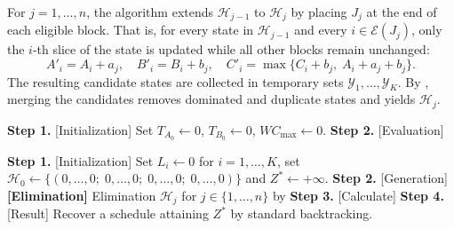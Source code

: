 ﻿\documentclass[12pt]{article}
\begin{document}
\begin{sloppypar}
For $j = 1,\dots,n$, the algorithm extends $\mathscr{H}_{j-1}$ to $\mathscr{H}_j$ by placing $J_j$
at the end of each eligible block. That is, for every state in $\mathscr{H}_{j-1}$ and every
$i \in \mathcal{E}(J_j)$, only the $i$-th slice of the state is updated while all other blocks
remain unchanged:
\begin{equation}\label{eq:transition}
A'_i = A_i + a_j,\quad
B'_i = B_i + b_j,\quad
C'_i = \max\{C_i + b_j,\; A_i + a_j + b_j\}.
\end{equation}
The resulting candidate states are collected in temporary sets $\mathcal{Y}_1,\dots,\mathcal{Y}_K$.
By , merging the candidates removes dominated and duplicate
states and yields $\mathscr{H}_{j}$.

\begin{algorithm}[H]
\small
\linespread{1.2}\selectfont
\SetAlgoLined
\DontPrintSemicolon
\caption{Block concatenation and evaluation}\label{alg:Block-concat}
\BlankLine
\textbf{Step 1.} [Initialization] Set $T_{A_0}\gets 0$, $T_{B_0}\gets 0$, $W C_{\max}\gets 0$. \;
\textbf{Step 2.} [Evaluation] 
\end{algorithm}

\begin{algorithm}[H]
\small
\linespread{1.2}\selectfont
\SetAlgoLined
\DontPrintSemicolon
\caption{DP for $F2 \parallel WC_{\max}$}\label{alg:dp}
\BlankLine
\textbf{Step 1.} [Initialization] Set $L_i\gets 0$ for $i=1,\dots,K$, set
	$\mathscr{H}_0\gets\{(0,\dots,0; \; 0,\dots,0; \; 0,\dots,0; \; 0,\dots,0)\}$ and $Z^{*}\gets+\infty$. \;
\textbf{Step 2.} [Generation] 
\textbf{[Elimination]} Elimination $\mathscr{H}_j$ for $j \in \{1,\dots,n\}$ by  \;
\textbf{Step 3.} [Calculate] 
\textbf{Step 4.} [Result] Recover a schedule attaining $Z^{*}$ by standard backtracking. \;
\end{algorithm}


\end{sloppypar}
\end{document}
